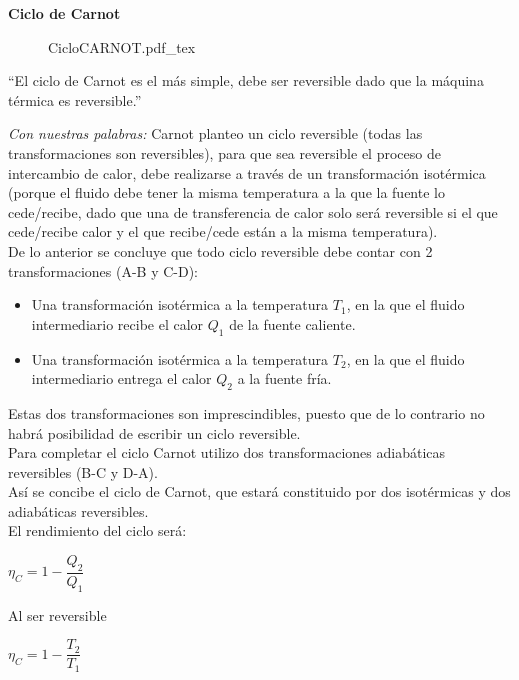 \documentclass[11pt,a4paper,twocolumn]{article}
\begin{document}
	\textbf{Ciclo de Carnot}\\
	
		\begin{figure}[ht]
			\centering
			\def\svgwidth{0.3\textwidth}
			{CicloCARNOT.pdf_tex}
		\end{figure}
	
	``El ciclo de Carnot es el más simple, debe ser reversible dado que la máquina térmica es reversible.''
	
	\textit{Con nuestras palabras:} Carnot planteo un ciclo reversible (todas las transformaciones son reversibles), para que sea reversible el proceso de intercambio de calor, debe realizarse a través de un transformación isotérmica (porque el fluido debe tener la misma temperatura a la que la fuente lo cede/recibe, dado que una de transferencia de calor solo será reversible si el que cede/recibe calor y el que recibe/cede están a la misma temperatura). \\
	De lo anterior se concluye que todo ciclo reversible debe contar con 2 transformaciones (A-B y C-D):
	\begin{itemize}
		\item Una transformación isotérmica a la temperatura $T_{1}$, en la que el fluido intermediario recibe el calor $Q_{1}$ de la fuente caliente.
		\item Una transformación isotérmica a la temperatura $T_{2}$, en la que el fluido intermediario entrega el calor $Q_{2}$ a la fuente fría.
	\end{itemize}
	Estas dos transformaciones son imprescindibles, puesto que de lo contrario no habrá posibilidad de escribir un ciclo reversible.\\
	Para completar el ciclo Carnot utilizo dos transformaciones adiabáticas reversibles (B-C y D-A).\\
	Así se concibe el ciclo de Carnot, que estará constituido por dos isotérmicas y dos adiabáticas reversibles.\\
	El rendimiento del ciclo será:
	\begin{center}
		$\eta_{C}=1-\dfrac{Q_{2}}{Q_{1}}$\\
	\end{center}
Al ser reversible
	\begin{center}
		$\eta_{C}=1-\dfrac{T_{2}}{T_{1}}$\\
	\end{center}
\end{document}

